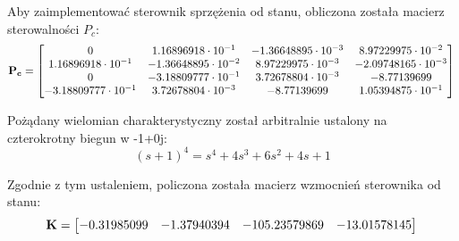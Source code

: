 \documentclass{article}
\begin{document}
Aby zaimplementować sterownik sprzężenia od stanu, obliczona została macierz sterowalności $P_c$:
\begin{equation}\label{eq:pc_matrix}
\mathbf{P_c} = \begin{bmatrix}  0 & 1.16896918\cdot10^{-1} & -1.36648895\cdot10^{-3} & 8.97229975\cdot10^{-2} \\
  							   1.16896918\cdot10^{-1} & -1.36648895\cdot10^{-2} & 8.97229975\cdot10^{-3} & -2.09748165\cdot10^{-3} \\
  							  0 & -3.18809777\cdot10^{-1} & 3.72678804\cdot10^{-3} & -8.77139699 \\
  							   -3.18809777\cdot10^{-1} & 3.72678804\cdot10^{-3} & -8.77139699 & 1.05394875\cdot10^{-1} \\ 
  			   \end{bmatrix} \\ \\
\end{equation}

Pożądany wielomian charakterystyczny został arbitralnie ustalony na czterokrotny biegun w -1+0j:
\begin{equation}\label{eq:des_ch_poly}
 (s + 1)^4 = s^4 + 4s^3 + 6s^2 + 4s + 1
\end{equation}

Zgodnie z tym ustaleniem, policzona została macierz wzmocnień sterownika od stanu:
\begin{equation}\label{eq:k_matrix}
\mathbf{K} = \begin{bmatrix}  -0.31985099 & -1.37940394 & -105.23579869 & -13.01578145 \\
  			   \end{bmatrix} \\ \\
\end{equation}
\end{document}
